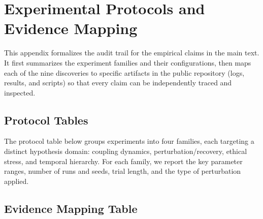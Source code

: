 \documentclass[11pt,a4paper]{article}
\begin{document}
\section{Experimental Protocols and Evidence Mapping}
\label{app:protocols}

This appendix formalizes the audit trail for the empirical claims in the main text. It first
summarizes the experiment families and their configurations, then maps each of the nine
discoveries to specific artifacts in the public repository (logs, results, and scripts) so
that every claim can be independently traced and inspected.

\subsection{Protocol Tables}

The protocol table below groups experiments into four families, each targeting a distinct
hypothesis domain: coupling dynamics, perturbation/recovery, ethical stress, and temporal
hierarchy. For each family, we report the key parameter ranges, number of runs and seeds,
trial length, and the type of perturbation applied.

\begin{table}[H]
\centering
\caption{Experiment Families}
\renewcommand{\arraystretch}{1.50}
\end{table}

\subsection{Evidence Mapping Table}
\end{document}
